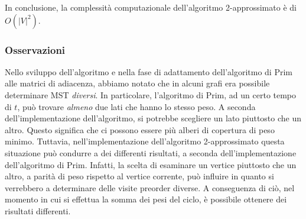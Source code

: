 In conclusione, la complessità computazionale dell'algoritmo 2-approssimato è di $O(|V|^2)$.

\subsubsection{Osservazioni}

Nello sviluppo dell'algoritmo e nella fase di adattamento dell'algoritmo di Prim alle matrici 
di adiacenza, abbiamo notato che in alcuni grafi era possibile determinare 
MST \textit{diversi}. In particolare, l'algoritmo di Prim, ad un certo tempo di $t$, può trovare 
\textit{almeno} due lati che hanno lo stesso peso. A seconda dell'implementazione 
dell'algoritmo, si potrebbe scegliere un lato piuttosto che un altro. Questo significa che 
ci possono essere più alberi di copertura di peso minimo. Tuttavia, nell'implementazione 
dell'algoritmo 2-approssimato questa situazione può condurre a dei differenti risultati, 
a seconda dell'implementazione dell'algoritmo di Prim. Infatti, la scelta di esaminare un 
vertice piuttosto che un altro, a parità di peso rispetto al vertice corrente, può 
influire in quanto si verrebbero a determinare delle visite preorder diverse. A conseguenza 
di ciò, nel momento in cui si effettua la somma dei pesi del ciclo, è possibile ottenere 
dei risultati differenti.
